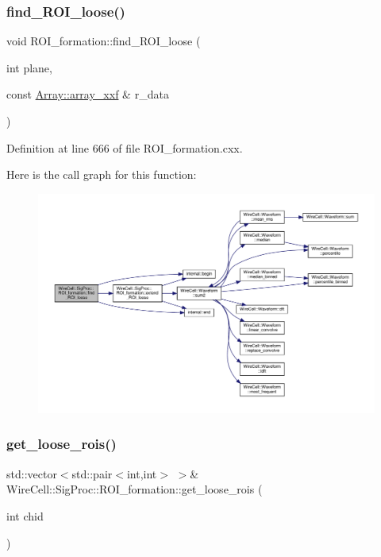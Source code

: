 \subsubsection{\texorpdfstring{find\+\_\+\+R\+O\+I\+\_\+loose()}{find\_ROI\_loose()}}
{\footnotesize\ttfamily void R\+O\+I\+\_\+formation\+::find\+\_\+\+R\+O\+I\+\_\+loose (\begin{DoxyParamCaption}\item[{int}]{plane,  }\item[{const \hyperlink{namespace_wire_cell_1_1_array_ab565fef5e33632bb02f0ed4be803020c}{Array\+::array\+\_\+xxf} \&}]{r\+\_\+data }\end{DoxyParamCaption})}



Definition at line 666 of file R\+O\+I\+\_\+formation.\+cxx.

Here is the call graph for this function\+:
\nopagebreak
\begin{figure}[H]
\begin{center}
\leavevmode
\includegraphics[width=350pt]{class_wire_cell_1_1_sig_proc_1_1_r_o_i__formation_af11c69caa55a69618d96892afcb46933_cgraph}
\end{center}
\end{figure}
\mbox{\label{class_wire_cell_1_1_sig_proc_1_1_r_o_i__formation_a851997f497e0bdf05982e955d6d4007d}} 
\subsubsection{\texorpdfstring{get\+\_\+loose\+\_\+rois()}{get\_loose\_rois()}}
{\footnotesize\ttfamily std\+::vector$<$std\+::pair$<$int,int$>$ $>$\& Wire\+Cell\+::\+Sig\+Proc\+::\+R\+O\+I\+\_\+formation\+::get\+\_\+loose\+\_\+rois (\begin{DoxyParamCaption}\item[{int}]{chid }\end{DoxyParamCaption})\hspace{0.3cm}{\ttfamily [inline]}}



